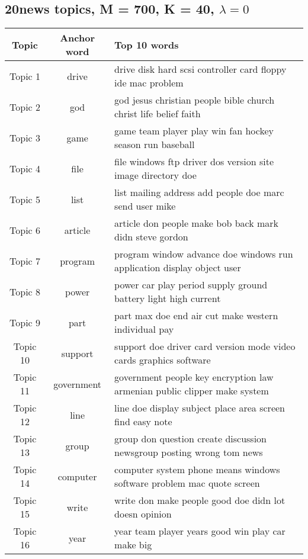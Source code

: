 \documentclass{article}
\begin{document}
\newpage

\subsection{20news topics, M = 700, K = 40, $\lambda=0$}
\label{appendix:K40-LAMBDA0}

\begin{table}[h]
   \begin{center}
  \begin{tabular}{|c|c|l|} \hline
           Topic & Anchor word & Top 10 words \\ \hline
Topic	1	&	drive & drive disk hard scsi controller card floppy ide mac problem	\\ \hline
Topic	2	&	god & god jesus christian people bible church christ life belief faith	\\ \hline
Topic	3	&	game & game team player play win fan hockey season run baseball	\\ \hline
Topic	4	&	file & file windows ftp driver dos version site image directory doe	\\ \hline
Topic	5	&	list & list mailing address add people doe marc send user mike	\\ \hline
Topic	6	&	article & article don people make bob back mark didn steve gordon	\\ \hline
Topic	7	&	program & program window advance doe windows run application display object user	\\ \hline
Topic	8	&	power & power car play period supply ground battery light high current	\\ \hline
Topic	9	&	part & part max doe end air cut make western individual pay	\\ \hline
Topic	10	&	support & support doe driver card version mode video cards graphics software	\\ \hline
Topic	11	&	government & government people key encryption law armenian public clipper make system	\\ \hline
Topic	12	&	line & line doe display subject place area screen find easy note	\\ \hline
Topic	13	&	group & group don question create discussion newsgroup posting wrong tom news	\\ \hline
Topic	14	&	computer & computer system phone means windows software problem mac quote screen	\\ \hline
Topic	15	&	write & write don make people good doe didn lot doesn opinion	\\ \hline
Topic	16	&	year & year team player years good win play car make big	\\ \hline

\end{tabular}
\end{center}
\end{table}
\end{document}
